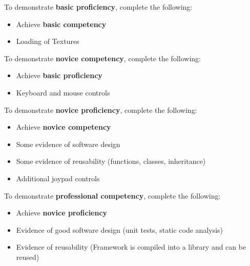 \documentclass{../../../fal_assignment}
\begin{document}
To demonstrate \textbf{basic proficiency}, complete the following:
\begin{itemize}
	\item Achieve \textbf{basic competency}
	\item Loading of Textures
\end{itemize}

To demonstrate \textbf{novice competency}, complete the following:
\begin{itemize}
	\item Achieve \textbf{basic proficiency}
	\item Keyboard and mouse controls
\end{itemize}

To demonstrate \textbf{novice proficiency}, complete the following:
\begin{itemize}
	\item Achieve \textbf{novice competency}
	\item Some evidence of software design
	\item Some evidence of reusability (functions, classes, inheritance) 
	\item Additional joypad controls
\end{itemize}

To demonstrate \textbf{professional competency}, complete the following:
\begin{itemize}
	\item Achieve \textbf{novice proficiency}
	\item Evidence of good software design (unit tests, static code analysis)
	\item Evidence of reusability (Framework is compiled into a library and can be reused)
\end{itemize}
\end{document}
